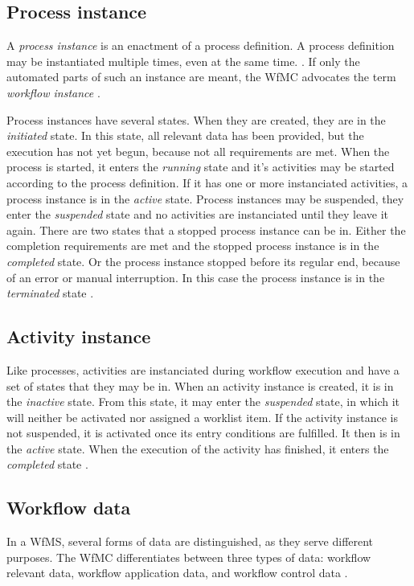   \subsection{Process instance} %
  \label{sub:process_instance}
    A \emph{process instance} is an enactment of a process definition. A process definition may be instantiated multiple times, even at the same time. \cite{Casati1999Specification}. If only the automated parts of such an instance are meant, the \ac{WfMC} advocates the term \emph{workflow instance} \cite{Hollingsworth1995Wfmc}.

    Process instances have several states. When they are created, they are in the \emph{initiated} state. In this state, all relevant data has been provided, but the execution has not yet begun, \eg because not all requirements are met. When the process is started, it enters the \emph{running} state and it's activities may be started according to the process definition. If it has one or more instanciated activities, a process instance is in the \emph{active} state. Process instances may be suspended, \ie they enter the \emph{suspended} state and no activities are instanciated until they leave it again. There are two states that a stopped process instance can be in. Either the completion requirements are met and the stopped process instance is in the \emph{completed} state. Or the process instance stopped before its regular end, \ie because of an error or manual interruption. In this case the process instance is in the \emph{terminated} state \cite{Hollingsworth1995Wfmc}.


  \subsection{Activity instance} %
  \label{sub:activity_instance}
    Like processes, activities are instanciated during workflow execution and have a set of states that they may be in. When an activity instance is created, it is in the \emph{inactive} state. From this state, it may enter the \emph{suspended} state, in which it will neither be activated nor assigned a worklist item. If the activity instance is not suspended, it is activated once its entry conditions are fulfilled. It then is in the \emph{active} state. When the execution of the activity has finished, it enters the \emph{completed} state \cite{Hollingsworth1995Wfmc}.

  \subsection{Workflow data} %
  \label{sub:workflow_data}
    In a \ac{WfMS}, several forms of data are distinguished, as they serve different purposes. The \ac{WfMC} differentiates between three types of data: workflow relevant data, workflow application data, and workflow control data \cite{Hollingsworth1995Wfmc}.


